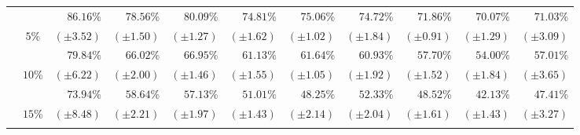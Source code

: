 \begin{table}[!htb]
\begin{center}
{\begin{tabular}{|c|c|r|r|r|r|r|r|r|r|r|}
						\cellcolor{colorTableHeader!15}
							& \cellcolor{colorTableHeader!15}
							& $86.16$\%
							& $78.56$\%
							& $80.09$\%
							& $74.81$\%
							& $75.06$\%
							& $74.72$\%
							& $71.86$\%
							& $70.07$\%
							& $71.03$\%
							\tabularnewline
						\cellcolor{colorTableHeader!15}
							& \multirow{-2}{*}{
								\cellcolor{colorTableHeader!15}
								$5$\%
							}
							& \footnotesize $(\pm3.52)$
							& \footnotesize $(\pm1.50)$
							& \footnotesize $(\pm1.27)$
							& \footnotesize $(\pm1.62)$
							& \footnotesize $(\pm1.02)$
							& \footnotesize $(\pm1.84)$
							& \footnotesize $(\pm0.91)$
							& \footnotesize $(\pm1.29)$
							& \footnotesize $(\pm3.09)$
							\tabularnewline
							\hhline{~----------}
						
						\cellcolor{colorTableHeader!15}
							& \cellcolor{colorTableHeader!15}
							& $79.84$\%
							& $66.02$\%
							& $66.95$\%
							& $61.13$\%
							& $61.64$\%
							& $60.93$\%
							& $57.70$\%
							& $54.00$\%
							& $57.01$\%
							\tabularnewline
						\cellcolor{colorTableHeader!15}
							& \multirow{-2}{*}{
								\cellcolor{colorTableHeader!15}
								$10$\%
							}
							& \footnotesize $(\pm6.22)$
							& \footnotesize $(\pm2.00)$
							& \footnotesize $(\pm1.46)$
							& \footnotesize $(\pm1.55)$
							& \footnotesize $(\pm1.05)$
							& \footnotesize $(\pm1.92)$
							& \footnotesize $(\pm1.52)$
							& \footnotesize $(\pm1.84)$
							& \footnotesize $(\pm3.65)$
							\tabularnewline
							\hhline{~----------}
						
						\cellcolor{colorTableHeader!15}
							& \cellcolor{colorTableHeader!15}
							& $73.94$\%
							& $58.64$\%
							& $57.13$\%
							& $51.01$\%
							& $48.25$\%
							& $52.33$\%
							& $48.52$\%
							& $42.13$\%
							& $47.41$\%
							\tabularnewline
						\cellcolor{colorTableHeader!15}
							& \multirow{-2}{*}{
								\cellcolor{colorTableHeader!15}
								$15$\%
							}
							& \footnotesize $(\pm8.48)$
							& \footnotesize $(\pm2.21)$
							& \footnotesize $(\pm1.97)$
							& \footnotesize $(\pm1.43)$
							& \footnotesize $(\pm2.14)$
							& \footnotesize $(\pm2.04)$
							& \footnotesize $(\pm1.61)$
							& \footnotesize $(\pm1.43)$
							& \footnotesize $(\pm3.27)$
							\tabularnewline
							\hhline{~----------}
						

\end{tabular}}
\end{center}
\end{table}
